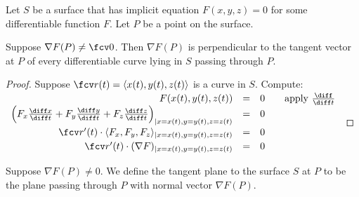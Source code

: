 \begin{frame}
Let $S$ be a surface that has implicit equation $F(x,y, z)=0 $ for some differentiable function $F$. Let $P$ be a point on the surface.
\begin{theorem}
Suppose $\nabla F(P)\neq \fcv 0$. Then $\nabla F(P)$ is perpendicular to the tangent vector at $P$ of every differentiable curve lying in $S$ passing through $P$.
\end{theorem}
\begin{proof}
Suppose $\fcv r(t)= \langle x(t), y(t), z(t) \rangle$ is a curve in $S$. Compute:
$
\renewcommand{\arraystretch}{1.2}
\begin{array}{rclll}
F(x(t), y(t), z(t))&=&0&&\text{apply }\frac{\diff }{\diff t}\\
\left(F_x \frac{\diff x}{\diff t}+F_y\frac{\diff y }{\diff t} +F_z\frac{\diff z}{\diff t}\right)_{|x=x(t), y=y(t), z=z(t)} &=&0\\
\fcv r'(t)\cdot \langle F_x, F_y, F_z \rangle _{|x=x(t), y=y(t), z=z(t)}&=&0 \\
\fcv r'(t)\cdot (\nabla F)_{|x=x(t), y=y(t), z=z(t)}&=&0\\ 
\end{array}
$
\end{proof}
\begin{definition}
Suppose $\nabla F(P)\neq 0$. We define the tangent plane to the surface $S$ at $P$ to be the plane passing through $P$ with normal vector $\nabla F(P)$.
\end{definition}
\end{frame}